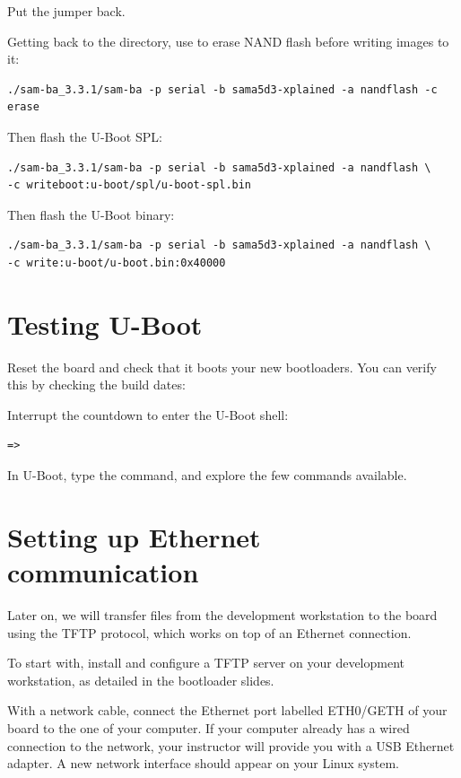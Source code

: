 Put the jumper back.

Getting back to the  directory, use  to erase
NAND flash before writing images to it:

\begin{verbatim}
./sam-ba_3.3.1/sam-ba -p serial -b sama5d3-xplained -a nandflash -c erase
\end{verbatim}

Then flash the U-Boot SPL:

\begin{verbatim}
./sam-ba_3.3.1/sam-ba -p serial -b sama5d3-xplained -a nandflash \
-c writeboot:u-boot/spl/u-boot-spl.bin
\end{verbatim}

Then flash the U-Boot binary:

\begin{verbatim}
./sam-ba_3.3.1/sam-ba -p serial -b sama5d3-xplained -a nandflash \
-c write:u-boot/u-boot.bin:0x40000
\end{verbatim}

\section{Testing U-Boot}

Reset the board and check that it boots your new bootloaders. You can
verify this by checking the build dates:



Interrupt the countdown to enter the U-Boot shell:
\begin{verbatim}
=>
\end{verbatim}

In U-Boot, type the  command, and explore the few commands
available.

\section{Setting up Ethernet communication}

Later on, we will transfer files from the development workstation to
the board using the TFTP protocol, which works on top of an Ethernet
connection.

To start with, install and configure a TFTP server on your development
workstation, as detailed in the bootloader slides.

With a network cable, connect the Ethernet port labelled ETH0/GETH of
your board to the one of your computer. If your computer already has a
wired connection to the network, your instructor will provide you with
a USB Ethernet adapter. A new network interface should appear on your
Linux system.

